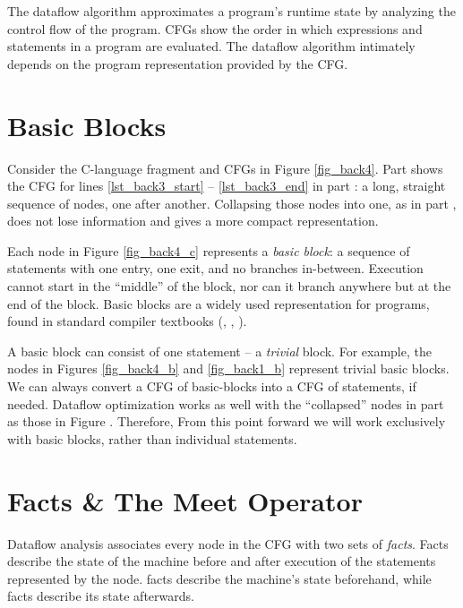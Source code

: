 \documentclass[12pt]{report}
\begin{document}
The dataflow algorithm approximates a program's runtime state by
analyzing the control flow of the program. CFGs show the order in
which expressions and statements in a program are evaluated. The
dataflow algorithm intimately depends on the program representation
provided by the CFG.

\section{Basic Blocks}
\label{sec_back3}

Consider the C-language fragment and CFGs in Figure
\ref{fig_back4}. Part  shows the CFG for lines
\ref{lst_back3_start} -- \ref{lst_back3_end} in part
: a long, straight sequence of nodes, one after
another. Collapsing those nodes into one, as in part
, does not lose information and gives a more
compact representation. 

\afterpage{\clearpage{}\clearpage}

Each node in Figure \ref{fig_back4_c} represents a \emph{basic block}:
a sequence of statements with one entry, one exit, and no branches
in-between. Execution cannot start in the ``middle'' of the block, nor
can it branch anywhere but at the end of the block. Basic blocks are a
widely used representation for programs, found in standard compiler
textbooks (\citep{AhoXX}, \citep{MunchXX}, \citep{AppelXX}).

A basic block can consist of one statement -- a \emph{trivial}
block. For example, the nodes in Figures \ref{fig_back4_b} and
\ref{fig_back1_b} represent trivial basic blocks. We can always
convert a CFG of basic-blocks into a CFG of statements, if needed.
Dataflow optimization works as well with the ``collapsed'' nodes in
part  as those in Figure
. Therefore, From this point forward we will work
exclusively with basic blocks, rather than individual statements.

\section{Facts \& The Meet Operator}
\label{sec_back4}
Dataflow analysis associates every node in the CFG with two sets of
\emph{facts}. Facts describe the state of the machine before and after
execution of the statements represented by the node. \In facts
describe the machine's state beforehand, while \out facts
describe its state afterwards.
\end{document}
